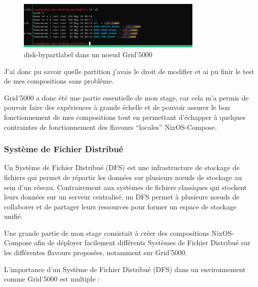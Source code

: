 \documentclass[a4paper,french,12pt, titlepage]{article}
\begin{document}
\begin{figure}[h]
\centering
\includegraphics[width=0.8\textwidth,height=0.8\textheight,keepaspectratio]{annexe/disk_g5k.png}
\caption{disk-bypartlabel dans un noeud Grid'5000}
\end{figure}

J'ai donc pu savoir quelle partition j'avais le droit de modifier et ai
pu finir le test de mes compositions sans problème.\newline

Grid'5000 a donc été une partie essentielle de mon stage, car cela m'a
permis de pouvoir faire des expériences à grande échelle et de pouvoir
assurer le bon fonctionnement de mes compositions tout en permettant
d'échapper à quelques contraintes de fonctionnement des flavours
``locales'' NixOS-Compose.\newline

\hypertarget{systuxe8me-de-fichier-distribuuxe9}{%
\subsubsection{Système de Fichier
Distribué}\label{systuxe8me-de-fichier-distribuuxe9}}

Un Système de Fichier Distribué (DFS) est une infrastructure de stockage
de fichiers qui permet de répartir les données sur plusieurs nœuds de
stockage au sein d'un réseau. Contrairement aux systèmes de fichiers
classiques qui stockent leurs données sur un serveur centralisé, un DFS
permet à plusieurs nœuds de collaborer et de partager leurs ressources
pour former un espace de stockage unifié.\newline

Une grande partie de mon stage consistait à créer des compositions
NixOS-Compose afin de déployer facilement différents Systèmes de Fichier
Distribué sur les différentes flavours proposées, notamment sur
Grid'5000.\newline

L'importance d'un Système de Fichier Distribué (DFS) dans un
environnement comme Grid'5000 est multiple :\newline
\end{document}
